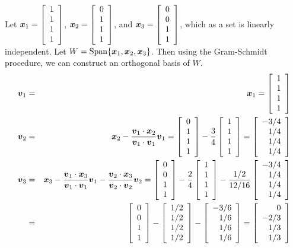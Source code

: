 \begin{Exam}\label{exam} Let $\boldsymbol x_1 = \left[\begin{array}{r} 1\\1\\1\\1 \end{array}\right]$, $\boldsymbol x_2 = \left[\begin{array}{r} 0\\1\\1\\1 \end{array}\right]$, and $\boldsymbol x_3 = \left[\begin{array}{r} 0\\0\\1\\1 \end{array}\right]$, which as a set is linearly independent. Let $W = \operatorname{Span}\{\boldsymbol x_1, \boldsymbol x_2, \boldsymbol x_3\}$. Then using the Gram-Schmidt procedure, we can construct an orthogonal basis of $W$.
\begin{eqnarray*}
\bb v_1 &=& \bb x_1 = \vr{1\\1\\1\\1}\\
\bb v_2 &=& \bb x_2 - \dfrac{\bb v_1\cdot \bb x_2}{\bb v_1\cdot \bb v_1}\bb v_1 = \vr{0\\1\\1\\1} - \dfrac{3}{4}\vr{1\\1\\1\\1} = \vr{-3/4\\1/4\\1/4\\1/4}\\
\bb v_3 &=& \bb x_3 - \dfrac{\bb v_1\cdot \bb x_3}{\bb v_1\cdot \bb v_1}\bb v_1 - \dfrac{\bb v_2\cdot \bb x_3}{\bb v_2\cdot \bb v_2}\bb v_2 = \vr{0\\0\\1\\1} - \dfrac{2}{4}\vr{1\\1\\1\\1} - \dfrac{1/2}{12/16}\vr{-3/4\\1/4\\1/4\\1/4} \\
&=& \vr{0\\0\\1\\1} - \vr{1/2\\1/2\\1/2\\1/2} - \vr{-3/6\\1/6\\1/6\\1/6} = \vr{0\\-2/3\\1/3\\1/3}

\end{eqnarray*}
\end{Exam}
